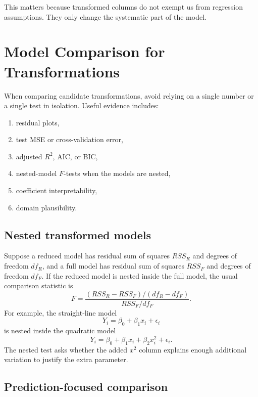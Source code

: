 This matters because transformed columns do not exempt us from regression assumptions.  They only change the systematic part of the model.

\section{Model Comparison for Transformations}

When comparing candidate transformations, avoid relying on a single number or a single test in isolation.  Useful evidence includes:
\begin{enumerate}
  \item residual plots,
  \item test MSE or cross-validation error,
  \item adjusted \(R^2\), AIC, or BIC,
  \item nested-model \(F\)-tests when the models are nested,
  \item coefficient interpretability,
  \item domain plausibility.
\end{enumerate}

\subsection*{Nested transformed models}

Suppose a reduced model has residual sum of squares \(RSS_R\) and degrees of freedom \(df_R\), and a full model has residual sum of squares \(RSS_F\) and degrees of freedom \(df_F\).  If the reduced model is nested inside the full model, the usual comparison statistic is
\begin{equation}
  F=\frac{(RSS_R-RSS_F)/(df_R-df_F)}{RSS_F/df_F}.
\end{equation}
For example, the straight-line model
\begin{equation}
  Y_i=\beta_0+\beta_1x_i+\epsilon_i
\end{equation}
is nested inside the quadratic model
\begin{equation}
  Y_i=\beta_0+\beta_1x_i+\beta_2x_i^2+\epsilon_i.
\end{equation}
The nested test asks whether the added \(x^2\) column explains enough additional variation to justify the extra parameter.

\subsection*{Prediction-focused comparison}

